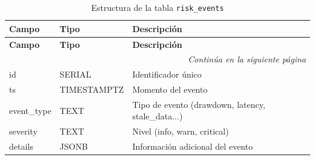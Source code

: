 \begin{longtable}{l l l}
\caption{Estructura de la tabla \texttt{risk\_events}} \\
\toprule
\textbf{Campo} & \textbf{Tipo} & \textbf{Descripción} \\
\midrule
\endfirsthead

\toprule
\textbf{Campo} & \textbf{Tipo} & \textbf{Descripción} \\
\midrule
\endhead

\midrule
\multicolumn{3}{r}{\textit{Continúa en la siguiente página}} \\
\midrule
\endfoot

\bottomrule
\endlastfoot

id           & SERIAL            & Identificador único \\
ts           & TIMESTAMPTZ       & Momento del evento \\
event\_type  & TEXT              & Tipo de evento (drawdown, latency, stale\_data...) \\
severity     & TEXT              & Nivel (info, warn, critical) \\
details      & JSONB             & Información adicional del evento \\
\end{longtable}
